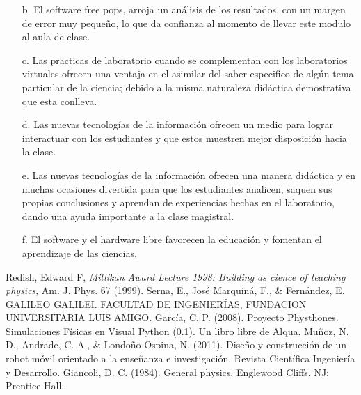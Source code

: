 \documentclass[12pt]{article}
\begin{document}
\begin{multicols}{2}
\begin{enumerate}
\item[b. ] El software free pops, arroja un análisis de los resultados, con un margen de error muy pequeño, lo que da confianza al momento de llevar este modulo al aula de clase.

\item[c. ] Las practicas de laboratorio cuando se complementan con los laboratorios virtuales ofrecen una ventaja en el asimilar del saber especifico de algún tema particular de la ciencia; debido a la misma naturaleza didáctica demostrativa que esta conlleva.

\item[d. ] Las nuevas tecnologías de la información ofrecen un medio para lograr interactuar con los estudiantes y que estos muestren mejor disposición hacia la clase. 

\item[e. ] Las nuevas tecnologías de la información ofrecen una manera didáctica y en muchas ocasiones divertida para que los estudiantes analicen, saquen sus propias conclusiones y aprendan de experiencias hechas en el laboratorio, dando una ayuda importante a la clase magistral.

\item[f. ] El software y el hardware libre favorecen la educación y fomentan el aprendizaje de las ciencias.

\end{enumerate}
\end{multicols}
\begin{thebibliography}{99}
 Redish, Edward F, \emph{Millikan Award Lecture 1998: Building as cience of teaching physics}, Am. J. Phys. 67 (1999).
 Serna, E., José Marquiná, F., \& Fernández, E. GALILEO GALILEI. FACULTAD DE INGENIERÍAS, FUNDACION UNIVERSITARIA LUIS AMIGO.
 García, C. P. (2008). Proyecto Physthones. Simulaciones Físicas en Visual Python (0.1). Un libro libre de Alqua.
 Muñoz, N. D., Andrade, C. A., \& Londoño Ospina, N. (2011). Diseño y construcción de un robot móvil orientado a la enseñanza e investigación. Revista Científica Ingeniería y Desarrollo.
 Giancoli, D. C. (1984). General physics. Englewood Cliffs, NJ: Prentice-Hall.

\end{thebibliography}
\end{document}
